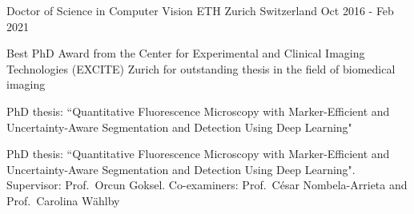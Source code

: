 


\begin{cventries}


\cventryag
{Doctor of Science in Computer Vision} %
{ETH Zurich}
{Switzerland}
{Oct 2016 - Feb 2021} %
{ %
\begin{cvitems}
\item {Best PhD Award from the Center for Experimental and Clinical Imaging Technologies (EXCITE) Zurich for outstanding thesis in the field of biomedical imaging}
    {\item {PhD thesis: ``Quantitative Fluorescence Microscopy with Marker-Efficient and Uncertainty-Aware Segmentation and Detection Using Deep Learning"}}
    {\item {{PhD thesis: ``Quantitative Fluorescence Microscopy with Marker-Efficient and Uncertainty-Aware Segmentation and Detection Using Deep Learning". Supervisor: Prof.\ Orcun Goksel. Co-examiners: Prof.\ C\'esar Nombela-Arrieta and Prof.\ Carolina W\"ahlby}}}
\end{cvitems}
}


\end{cventries}
